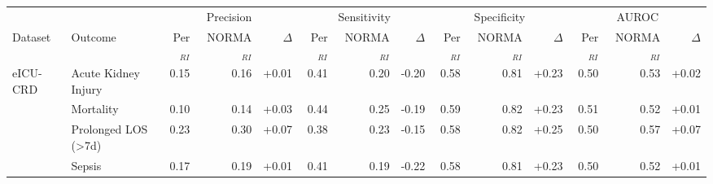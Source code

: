 \begin{table}[ht]
\centering
\footnotesize
\begin{tabular}{llrrrrrrrrrrrr}
\toprule
 &  & \multicolumn{3}{c}{Precision} & \multicolumn{3}{c}{Sensitivity} & \multicolumn{3}{c}{Specificity} & \multicolumn{3}{c}{AUROC} \\
\cmidrule(lr){3-5} \cmidrule(lr){6-8} \cmidrule(lr){9-11} \cmidrule(lr){12-14}
Dataset & Outcome & Per$_{RI}$ & NORMA$_{RI}$ & $\Delta$ & Per$_{RI}$ & NORMA$_{RI}$ & $\Delta$ & Per$_{RI}$ & NORMA$_{RI}$ & $\Delta$ & Per$_{RI}$ & NORMA$_{RI}$ & $\Delta$ \\
\midrule
eICU-CRD & Acute Kidney Injury & 0.15 & 0.16 & +0.01 & 0.41 & 0.20 & -0.20 & 0.58 & 0.81 & +0.23 & 0.50 & 0.53 & +0.02 \\
 & Mortality & 0.10 & 0.14 & +0.03 & 0.44 & 0.25 & -0.19 & 0.59 & 0.82 & +0.23 & 0.51 & 0.52 & +0.01 \\
 & Prolonged LOS (>7d) & 0.23 & 0.30 & +0.07 & 0.38 & 0.23 & -0.15 & 0.58 & 0.82 & +0.25 & 0.50 & 0.57 & +0.07 \\
 & Sepsis & 0.17 & 0.19 & +0.01 & 0.41 & 0.19 & -0.22 & 0.58 & 0.81 & +0.23 & 0.50 & 0.52 & +0.01 \\
\bottomrule
\end{tabular}
\label{tab:12_eval}
\end{table}